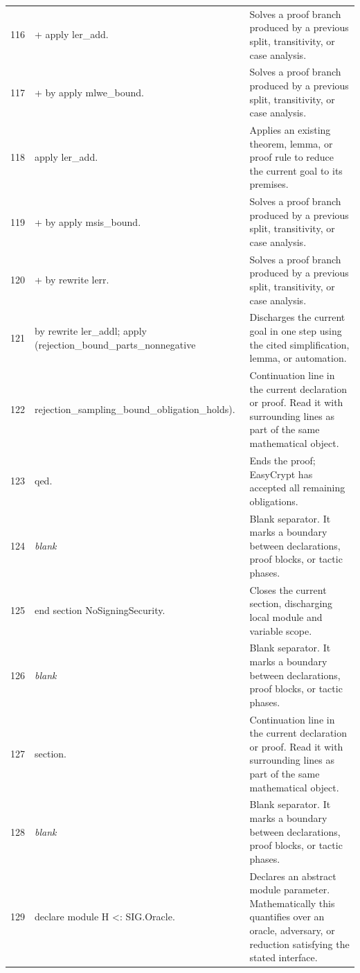 \documentclass[10pt]{article}
\begin{document}
\begin{longtable}{r L{0.53\textwidth} L{0.37\textwidth}}
116 & {\ttfamily\scriptsize + apply ler\_add.} & Solves a proof branch produced by a previous split, transitivity, or case analysis. \\
117 & {\ttfamily\scriptsize   + by apply mlwe\_bound.} & Solves a proof branch produced by a previous split, transitivity, or case analysis. \\
118 & {\ttfamily\scriptsize   apply ler\_add.} & Applies an existing theorem, lemma, or proof rule to reduce the current goal to its premises. \\
119 & {\ttfamily\scriptsize   + by apply msis\_bound.} & Solves a proof branch produced by a previous split, transitivity, or case analysis. \\
120 & {\ttfamily\scriptsize   + by rewrite lerr.} & Solves a proof branch produced by a previous split, transitivity, or case analysis. \\
121 & {\ttfamily\scriptsize by rewrite ler\_addl; apply (rejection\_bound\_parts\_nonnegative} & Discharges the current goal in one step using the cited simplification, lemma, or automation. \\
122 & {\ttfamily\scriptsize                             rejection\_sampling\_bound\_obligation\_holds).} & Continuation line in the current declaration or proof.  Read it with surrounding lines as part of the same mathematical object. \\
123 & {\ttfamily\scriptsize qed.} & Ends the proof; EasyCrypt has accepted all remaining obligations. \\
124 & {\ttfamily\scriptsize \emph{blank}} & Blank separator.  It marks a boundary between declarations, proof blocks, or tactic phases. \\
125 & {\ttfamily\scriptsize end section NoSigningSecurity.} & Closes the current section, discharging local module and variable scope. \\
126 & {\ttfamily\scriptsize \emph{blank}} & Blank separator.  It marks a boundary between declarations, proof blocks, or tactic phases. \\
127 & {\ttfamily\scriptsize section.} & Continuation line in the current declaration or proof.  Read it with surrounding lines as part of the same mathematical object. \\
128 & {\ttfamily\scriptsize \emph{blank}} & Blank separator.  It marks a boundary between declarations, proof blocks, or tactic phases. \\
129 & {\ttfamily\scriptsize declare module H <: SIG.Oracle.} & Declares an abstract module parameter.  Mathematically this quantifies over an oracle, adversary, or reduction satisfying the stated interface. \\

\end{longtable}
\end{document}
